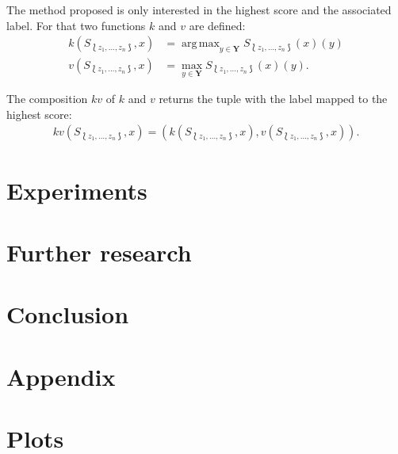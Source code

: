 \documentclass[twoside,11pt]{article}
\DeclareMathOperator*{\argmax}{arg\,max}
\def\ds{\Lbag z_1,\dots,z_n \Rbag}
\begin{document}
The method proposed is only interested in the highest
score and the associated label. For that two functions
$k$ and $v$ are defined:
\begin{align*}
  k(S_{\ds}, x) &= \argmax_{y \in \textbf{Y}}
    S_{\ds}(x)(y) \\
  v(S_{\ds}, x) &= \max_{y \in \textbf{Y}}
    S_{\ds}(x)(y).
\end{align*}

The composition $kv$ of $k$ and $v$ returns the tuple with
the label mapped to the highest score:
\begin{align*}
  kv(S_{\ds}, x) = (k(S_{\ds}, x), v(S_{\ds}, x)).
\end{align*}







\section{Experiments}


\section{Further research}

\section{Conclusion}

\renewcommand{\appendixpagename}{}
\begin{appendices}
  \section*{Appendix}

  \section{Plots}

\end{appendices}
\end{document}
